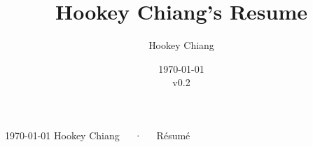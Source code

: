 \documentclass[11pt, a4paper]{awesome-cv}
\title{Hookey Chiang's Resume}
\author{Hookey Chiang}
\date{\today\\v0.2}
\begin{document}
\makecvheader[C]

\makecvfooter
  {\today}
  {Hookey Chiang~~~·~~~Résumé}
  {\thepage}




% 
% 
% 
% 
% 


% 



\end{document}
